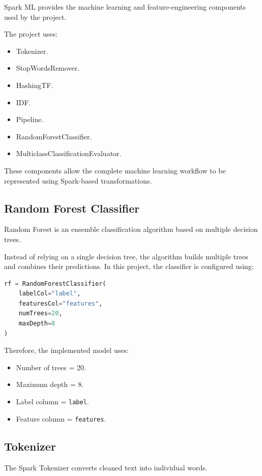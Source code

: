 \documentclass[12pt,a4paper]{article}
\begin{document}
Spark ML provides the machine learning and feature-engineering components used by the project.

The project uses:

\begin{itemize}
    \item Tokenizer.
    \item StopWordsRemover.
    \item HashingTF.
    \item IDF.
    \item Pipeline.
    \item RandomForestClassifier.
    \item MulticlassClassificationEvaluator.
\end{itemize}

These components allow the complete machine learning workflow to be represented using Spark-based transformations.

\subsection{Random Forest Classifier}

Random Forest is an ensemble classification algorithm based on multiple decision trees.

Instead of relying on a single decision tree, the algorithm builds multiple trees and combines their predictions. In this project, the classifier is configured using:

\begin{lstlisting}[language=Python]
rf = RandomForestClassifier(
    labelCol="label",
    featuresCol="features",
    numTrees=20,
    maxDepth=8
)
\end{lstlisting}

Therefore, the implemented model uses:

\begin{itemize}
    \item Number of trees = 20.
    \item Maximum depth = 8.
    \item Label column = \texttt{label}.
    \item Feature column = \texttt{features}.
\end{itemize}

\subsection{Tokenizer}

The Spark Tokenizer converts cleaned text into individual words.
\end{document}

